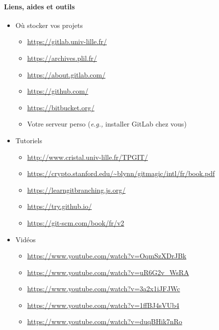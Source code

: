 \documentclass[final, a4paper, openbib, ]{article}
\begin{document}
\paragraph{Liens, aides et outils}
\begin{itemize}
	\item Où stocker vos projets
	\begin{itemize}
		\item \url{https://gitlab.univ-lille.fr/}	
		\item \url{https://archives.plil.fr/}
		\item \url{https://about.gitlab.com/}
		\item \url{https://github.com/}
		\item \url{https://bitbucket.org/}
		\item Votre serveur perso (\textit{e.g.,} installer GitLab chez vous)
	\end{itemize}
	\item Tutoriels
	\begin{itemize}
		\item \url{http://www.cristal.univ-lille.fr/TPGIT/}
		\item \url{https://crypto.stanford.edu/~blynn/gitmagic/intl/fr/book.pdf}
		\item \url{https://learngitbranching.js.org/}
		\item \url{https://try.github.io/}
		\item \url{https://git-scm.com/book/fr/v2}
	\end{itemize}
	\item Vidéos
	\begin{itemize}
		\item \url{https://www.youtube.com/watch?v=OqmSzXDrJBk}
		\item \url{https://www.youtube.com/watch?v=uR6G2v_WsRA}
		\item \url{https://www.youtube.com/watch?v=3a2x1iJFJWc}
		\item \url{https://www.youtube.com/watch?v=1ffBJ4sVUb4}
		\item \url{https://www.youtube.com/watch?v=duqBHik7nRo}
	\end{itemize}
\end{itemize}
\end{document}
